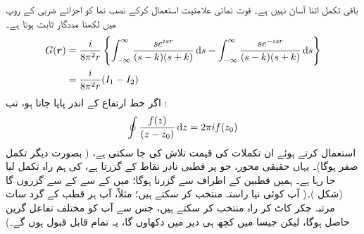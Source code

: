 باقی تکمل اتنا آسان نہیں ہے۔ قوت نمائی علامتیت استعمال کرکے نصب نما کو اجزائے ضربی کے  روپ میں لکھنا مددگار ثابت ہوتا ہے۔
\begin{align}\label{مساوات_بکھراو_گرین_دوبارہ}
	G(\kvec{r}) &= \frac{i}{8\pi^2r}\left\{\int_{-\infty}^{\infty}\frac{se^{isr}}{(s-k)(s+k)}\dif s-\int_{-\infty}^{\infty}\frac{se^{-isr}}{(s-k)(s+k)}\dif s\right\}\nonumber \\
	&= \frac{i}{8\pi^2r}(I_1-I_2)
\end{align}
اگر  خط ارتفاع  کے اندر پایا جاتا ہو،  تب  : 
\begin{align}
	\oint\frac{f(z)}{(z-z_0)}\dif z = 2\pi if(z_0)
\end{align}
استعمال کرتے ہوئے ان تکملات کی قیمت تلاش کی جا سکتی ہے،   ( بصورت دیگر تکمل صفر ہوگا)۔ یہاں حقیقی محور،  جو  پر قطبی نادر نقاط  کے   گزرتا ہے،   کی ہم راہ  تکمل لیا جا رہا ہے۔ ہمیں قطبین کے اطراف سے گزرنا ہوگا؛  میں  کے   سے  کے     سے گزروں گا (شکل )۔( آپ کوئی نیا راستہ منتخب کر سکتے ہیں؛  مثلاً،  آپ ہر قطب کے گرد سات مرتبہ چکر کاٹ کر راہ منتخب کر سکتے ہیں،  جس سے آپ کو  مختلف تفاعل گرین حاصل ہوگا،  لیکن  جیسا میں کچھ ہی دیر میں دکھاوں گا،   یہ تمام قابل قبول ہوں گے۔)


